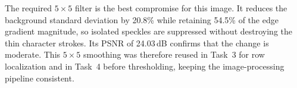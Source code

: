 The required $5\times5$ filter is the best compromise for this image.  It
reduces the background standard deviation by 20.8\% while retaining 54.5\% of
the edge gradient magnitude, so isolated speckles are suppressed without
destroying the thin character strokes.  Its PSNR of 24.03\,dB confirms that the
change is moderate.  This $5\times5$ smoothing was therefore reused in
Task~3 for row localization and in Task~4 before thresholding, keeping the
image-processing pipeline consistent.

\FloatBarrier
